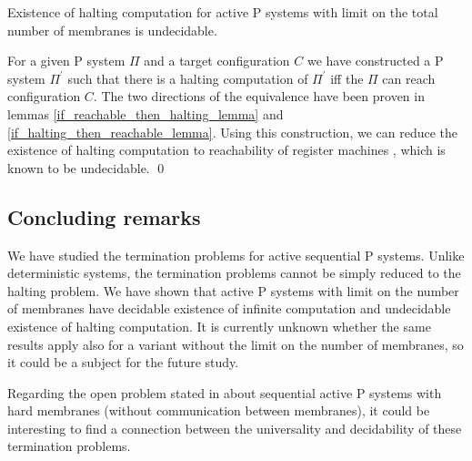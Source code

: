 \begin{veta}
\label{existence_of_halting_theorem}
  Existence of halting computation for active P systems with limit on the total number of membranes is undecidable.
\end{veta}

\begin{dokaz}
  For a given P system $\Pi$ and a target configuration $C$ we have constructed a P system $\Pi^\prime$ such that there is a halting computation of $\Pi^\prime$ iff the $\Pi$ can reach configuration $C$. The two directions of the equivalence have been proven in lemmas \ref{if_reachable_then_halting_lemma} and \ref{if_halting_then_reachable_lemma}. Using this construction, we can reduce the existence of halting computation to reachability of register machines \cite{Ibarra05Active}, which is known to be undecidable. \qed
\end{dokaz}



\subsection{Concluding remarks} %
\label{sub:concluding_remarks}

We have studied the termination problems for active sequential P systems. Unlike deterministic systems, the termination problems cannot be simply reduced to the halting problem. We have shown that active P systems with limit on the number of membranes have decidable existence of infinite computation and undecidable existence of halting computation. It is currently unknown whether the same results apply also for a variant without the limit on the number of membranes, so it could be a subject for the future study.

Regarding the open problem stated in \cite{Ibarra05Active} about sequential active P systems with hard membranes (without communication between membranes), it could be interesting to find a connection between the universality and decidability of these termination problems.

